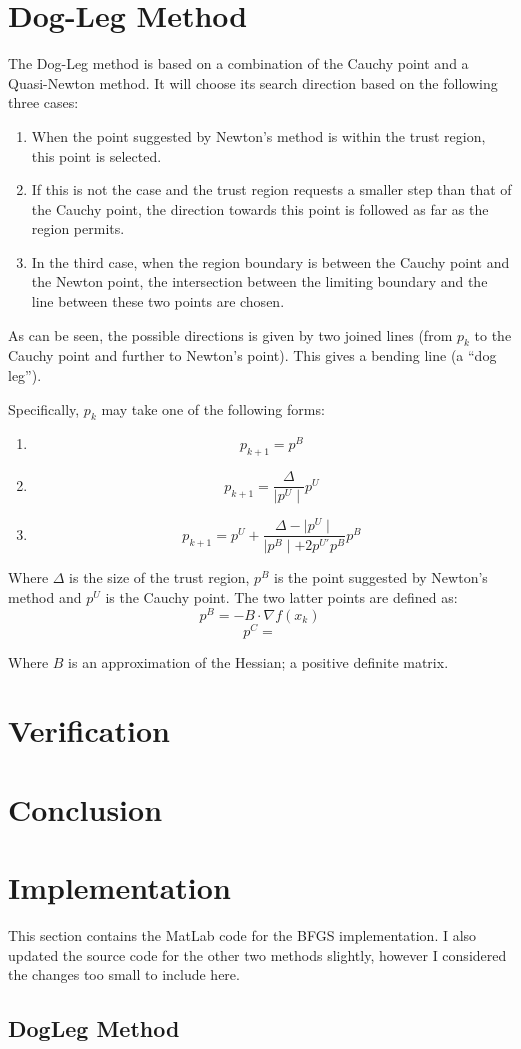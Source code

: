\documentclass[10pt,oneside,a4paper,final,english]{memoir}
\begin{document}
\section{Dog-Leg Method}
The Dog-Leg method is based on a combination of the Cauchy point and
a Quasi-Newton method. It will choose its search direction based on
the following three cases:
\begin{enumerate}
\item When the point suggested by Newton's method is within the trust
  region, this point is selected.
\item If this is not the case and the trust region requests a smaller
  step than that of the Cauchy point, the direction towards this point
  is followed as far as the region permits.
\item In the third case, when the region boundary is between the
  Cauchy point and the Newton point, the intersection between the
  limiting boundary and the line between these two points are chosen.
\end{enumerate}

As can be seen, the possible directions is given by two joined lines
(from $p_k$ to the Cauchy point and further to Newton's point). This
gives a bending line (a ``dog leg'').

Specifically, $p_k$ may take one of the following forms:
\begin{enumerate}
\item \[ p_{k+1} = p^B \]
\item \[ p_{k+1} = \frac{\Delta}{\mid p^U\mid}  p^U \]
\item \[ p_{k+1} = p^U + \frac{\Delta - \mid p^U\mid}{
    \mid p^B\mid + 2p^{U\prime} p^B} p^B \]
\end{enumerate}

Where $\Delta$ is the size of the trust region, $p^B$ is the point
suggested by Newton's method and $p^U$ is the Cauchy point. The two
latter points are defined as:
\[ p^B = -B \cdot \nabla f (x_k) \]
\[ p^C =  \]



Where $B$ is an approximation of the Hessian; a positive definite
matrix.



\section{Verification}


\section{Conclusion}

\section{Implementation}
This section contains the MatLab code for the BFGS implementation. I
also updated the source code for the other two methods slightly,
however I considered the changes too small to include here.

\subsection{DogLeg Method}

\end{document}

